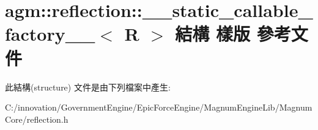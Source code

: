 \hypertarget{structagm_1_1reflection_1_1____static__callable__factory____}{}\section{agm\+:\+:reflection\+:\+:\+\_\+\+\_\+static\+\_\+callable\+\_\+factory\+\_\+\+\_\+$<$ R $>$ 結構 樣版 參考文件}
\label{structagm_1_1reflection_1_1____static__callable__factory____}


此結構(structure) 文件是由下列檔案中產生\+:\begin{DoxyCompactItemize}
\item 
C\+:/innovation/\+Government\+Engine/\+Epic\+Force\+Engine/\+Magnum\+Engine\+Lib/\+Magnum\+Core/reflection.\+h\end{DoxyCompactItemize}
